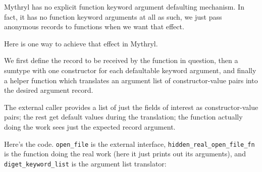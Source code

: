 Mythryl has no explicit function keyword argument defaulting mechanism.  In fact, 
it has no function keyword arguments at all as such, we just pass anonymous 
records to functions when we want that effect.

Here is one way to achieve that effect in Mythryl.

We first define the record to be received by the function in question, 
then a sumtype with one constructor for each defaultable keyword 
argument, and finally a helper function which translates an argument 
list of constructor-value pairs into the desired argument record.

The external caller provides a list of just the fields of interest as 
constructor-value pairs; the rest get default values during the 
translation; the function actually doing the work sees just the 
expected record argument.

Here's the code.  {\tt open\_file} is the external interface, 
{\tt hidden\_real\_open\_file\_fn} is the function doing the real work 
(here it just prints out its arguments), and {\tt diget\_keyword\_list} 
is the argument list translator:

